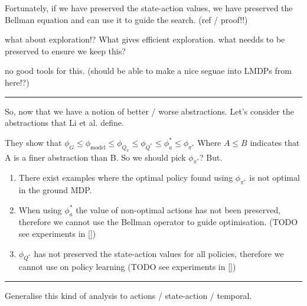Fortunately, if we have preserved the state-action values, we have preserved the Bellman equation and can use it to guide the search. {\color{red}(ref / proof!!)}

{\color{red}what about exploration}!?
What gives efficient exploration. what needds to be preserved to ensure we keep this?

{\color{red}no good tools for this. (should be able to make a nice seguae into LMDPs from here!?)}

\begin{center}\rule{0.5\linewidth}{\linethickness}\end{center}


So, now that we have a notion of better / worse abstractions. Let's consider the abstractions
that Li et al. \cite{Littman2006} define.

They show that $\phi_G \le \phi_{\text{model}} \le \phi_{Q_{\pi}} \le \phi_{Q^{* }} \le \phi_a^{* } \le \phi_{\pi^{* }}$
Where $A \le B$ indicates that A is a finer abstraction than B.
So we should pick $\phi_{\pi^{* }}$? But.

\begin{enumerate}
  \tightlist
  \item There exist examples where the optimal policy found using $\phi_{\pi^{* }}$ is not optimal in the ground MDP. \cite{Jong2005}
  \item When using $\phi_a^{* }$ the value of non-optimal actions has not been preserved,
  therefore we cannot use the Bellman operator to guide optimisation. ({\color{red}TODO} see experiments in \ref{})
  \item $\phi_{Q^{* }}$ has not preserved the state-action values for all policies,
  therefore we cannot use on policy learning ({\color{red}TODO} see experiments in \ref{})
\end{enumerate}


\begin{center}\rule{0.5\linewidth}{\linethickness}\end{center}

Generalise this kind of analysis to actions / state-action / temporal.



